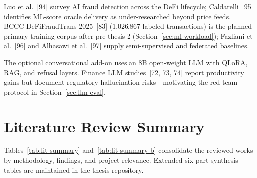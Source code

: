 \documentclass[12pt, a4paper]{report}
\begin{document}
Luo et al.~[94] survey AI fraud detection across the DeFi lifecycle; Caldarelli~[95] identifies ML-score oracle delivery as under-researched beyond price feeds. BCCC-DeFiFraudTrans-2025~[83] (1,026,867 labeled transactions) is the planned primary training corpus after pre-thesis 2 (Section~\ref{sec:ml-workload}); Fazliani et al.~[96] and Alhasawi et al.~[97] supply semi-supervised and federated baselines.

The optional conversational add-on uses an 8B open-weight LLM with QLoRA, RAG, and refusal layers. Finance LLM studies~[72, 73, 74] report productivity gains but document regulatory-hallucination risks---motivating the red-team protocol in Section~\ref{sec:llm-eval}.

\section{Literature Review Summary}

Tables~\ref{tab:lit-summary} and~\ref{tab:lit-summary-b} consolidate the reviewed works by methodology, findings, and project relevance. Extended six-part synthesis tables are maintained in the thesis repository.
\end{document}
